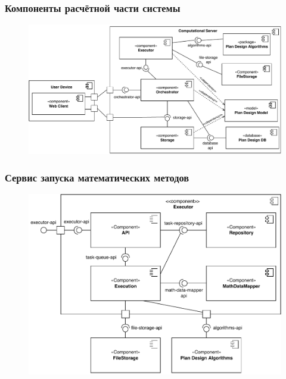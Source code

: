 \begin{frame}
\frametitle{Компоненты расчётной части системы}
\begin{figure}
    \includegraphics[scale=.6]{pictures/architecture/component}
\end{figure}
\end{frame}

\begin{frame}
\frametitle{Сервис запуска математических методов}
\begin{figure}
    \includegraphics[scale=.6]{pictures/architecture/executor_component_common}
\end{figure}
\end{frame}

